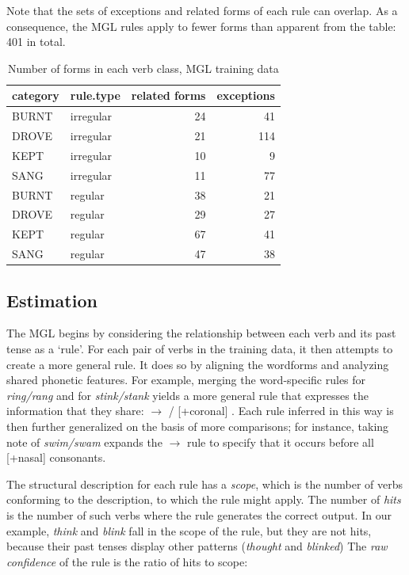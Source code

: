 \documentclass[12pt]{article}
\begin{document}
Note that the sets of exceptions and related forms of each rule can overlap.  As a consequence, the MGL rules apply to fewer forms than apparent from the table: 401 in total.

\begin{table}[ht]
\centering
\begin{tabular}{llrr}
  \hline
category & rule.type & related forms & exceptions \\ 
  \hline
BURNT & irregular &  24 &  41 \\ 
  DROVE & irregular &  21 & 114 \\ 
  KEPT & irregular &  10 &   9 \\ 
  SANG & irregular &  11 &  77 \\ 
  BURNT & regular &  38 &  21 \\ 
  DROVE & regular &  29 &  27 \\ 
  KEPT & regular &  67 &  41 \\ 
  SANG & regular &  47 &  38 \\ 
   \hline
\end{tabular}
\caption{Number of forms in each verb class, MGL training data} 
\label{mglsetsize}
\end{table}
\subsection{Estimation}

The MGL begins by considering the relationship between each verb and its past tense as a `rule'. For each pair of verbs in the training data, it then attempts to create a more general rule. It does so by aligning the wordforms and analyzing shared phonetic features. For example,  merging the word-specific rules for {\em ring/rang} and for {\em stink/stank} yields a more general rule that expresses the information that they share: \textipa{[I]} $\rightarrow{}$\textipa{[\ae]} / [+coronal] \underline{\hspace{0.5cm}} \textipa{[N]}. Each rule inferred in this way is then further generalized on the basis of more comparisons; for instance, taking note of {\em swim/swam} expands the \textipa{[I]} $\rightarrow{}$\textipa{[\ae]} rule to specify that it occurs before all [+nasal] consonants. 

The structural description for each rule has a {\em scope}, which is the number of verbs conforming to the description, to which the rule might apply. The number of {\em hits} is the number of such verbs where the rule generates the correct output. In our example, {\em think} and {\em blink} fall in the scope of the rule, but they are not hits, because their past tenses display other patterns ({\em thought} and {\em blinked})
The {\it raw confidence} of the rule is the ratio of hits to scope: 
\end{document}
